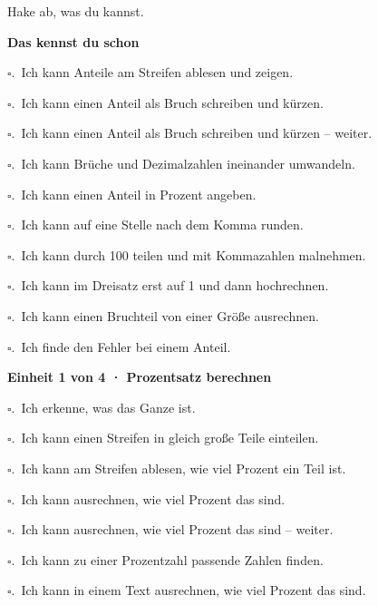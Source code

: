 \clearpage
\hypertarget{abhaken}{}
{\small Hake ab, was du kannst.\par}
\medskip
{\small
\par\smallskip\noindent\textbf{Das kennst du schon}\par
\noindent$\square$.\ Ich kann Anteile am Streifen ablesen und zeigen.\par
\noindent$\square$.\ Ich kann einen Anteil als Bruch schreiben und kürzen.\par
\noindent$\square$.\ Ich kann einen Anteil als Bruch schreiben und kürzen – weiter.\par
\noindent$\square$.\ Ich kann Brüche und Dezimalzahlen ineinander umwandeln.\par
\noindent$\square$.\ Ich kann einen Anteil in Prozent angeben.\par
\noindent$\square$.\ Ich kann auf eine Stelle nach dem Komma runden.\par
\noindent$\square$.\ Ich kann durch 100 teilen und mit Kommazahlen malnehmen.\par
\noindent$\square$.\ Ich kann im Dreisatz erst auf 1 und dann hochrechnen.\par
\noindent$\square$.\ Ich kann einen Bruchteil von einer Größe ausrechnen.\par
\noindent$\square$.\ Ich finde den Fehler bei einem Anteil.\par
\par\smallskip\noindent\textbf{Einheit 1 von 4 · Prozentsatz berechnen}\par
\noindent$\square$.\ Ich erkenne, was das Ganze ist.\par
\noindent$\square$.\ Ich kann einen Streifen in gleich große Teile einteilen.\par
\noindent$\square$.\ Ich kann am Streifen ablesen, wie viel Prozent ein Teil ist.\par
\noindent$\square$.\ Ich kann ausrechnen, wie viel Prozent das sind.\par
\noindent$\square$.\ Ich kann ausrechnen, wie viel Prozent das sind – weiter.\par
\noindent$\square$.\ Ich kann zu einer Prozentzahl passende Zahlen finden.\par
\noindent$\square$.\ Ich kann in einem Text ausrechnen, wie viel Prozent das sind.\par
}

